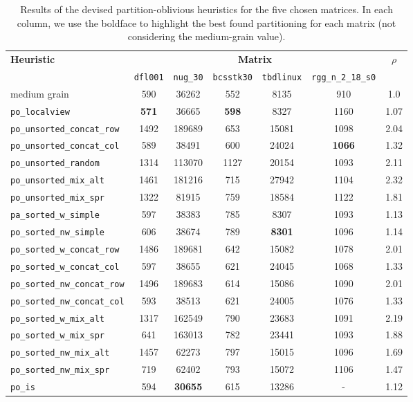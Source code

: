 \begin{table}[h]
	\centering

	\renewcommand{\arraystretch}{1.2}
	\begin{tabular}{|l||c|c|c|c|c||c|}
		\hline
		\multirow{2}{*}{\textbf{Heuristic}} &  \multicolumn{5}{|c||}{\textbf{Matrix}} & \multirow{2}{*}{$\rho$} \\ \cline{2-6}
		& \texttt{dfl001} & \texttt{nug\_30} & \texttt{bcsstk30} & \texttt{tbdlinux} & \texttt{rgg\_n\_2\_18\_s0} & \\ \hline
		medium grain & 590 & 36262 & 552 & 8135 & 910 & 1.0 \\ \hline %
		\verb|po_localview|& \textbf{571} & 36665 & \textbf{598} & 8327 & 1160  & 1.07 \\  %
		\verb|po_unsorted_concat_row|& 1492 & 189689 & 653 & 15081 & 1098 & 2.04 \\ %
		\verb|po_unsorted_concat_col|& 589 & 38491  & 600 & 24024 & \textbf{1066} & 1.32 \\ %
		\verb|po_unsorted_random|& 1314 & 113070 & 1127 & 20154 & 1093 & 2.11 \\  %
		\verb|po_unsorted_mix_alt|& 1461 & 181216 & 715 & 27942 & 1104 & 2.32 \\  %
		\verb|po_unsorted_mix_spr|& 1322 & 81915 & 759 & 18584 & 1122 & 1.81 \\  %
		\verb|pa_sorted_w_simple|& 597 & 38383 & 785  & 8307 & 1093 & 1.13 \\ %
		\verb|po_sorted_nw_simple|& 606 & 38674 & 789 & \textbf{8301} & 1096 & 1.14 \\ %
		\verb|po_sorted_w_concat_row|& 1486 & 189681 & 642 & 15082 & 1078 & 2.01 \\ %
		\verb|po_sorted_w_concat_col|& 597 & 38655 & 621 & 24045 & 1068 & 1.33 \\  %
		\verb|po_sorted_nw_concat_row|& 1496 & 189683 & 614 & 15086 & 1090 & 2.01 \\ %
		\verb|po_sorted_nw_concat_col|& 593 & 38513 & 621 & 24005 & 1076 & 1.33 \\ %
		\verb|po_sorted_w_mix_alt|& 1317 & 162549 & 790 & 23683 & 1091 & 2.19 \\ %
		\verb|po_sorted_w_mix_spr|& 641 & 163013 & 782 & 23441 & 1093 & 1.88 \\ %
		\verb|po_sorted_nw_mix_alt|& 1457 & 62273 & 797 & 15015 & 1096 & 1.69 \\ %
		\verb|po_sorted_nw_mix_spr|& 719 & 62402 & 793 & 15072 & 1106 & 1.47 \\  %
		\verb|po_is|& 594 & \textbf{30655} & 615 & 13286 & -  & 1.12 \\ %
		\hline
	\end{tabular}
	\caption{Results of the devised partition-oblivious heuristics for the five chosen matrices. In each column, we use the boldface to highlight the best found partitioning for each matrix (not considering the medium-grain value). } \label{tab:preliminary_po}
\end{table}

